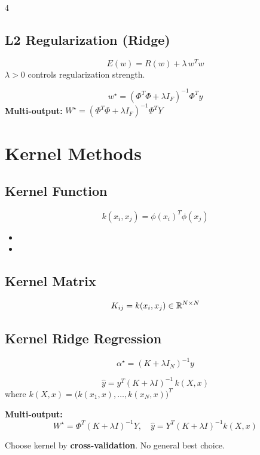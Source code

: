 \documentclass[8pt,a4paper,landscape]{extarticle}
\begin{document}
\begin{multicols*}{4}
\subsection{L2 Regularization (Ridge)}
\begin{defn}[title=Regularized Objective]
\[ E(w) = R(w) + \lambda\,w^T w \]
$\lambda>0$ controls regularization strength.
\end{defn}

\begin{thm}[title=Ridge Regression Solution]
\[ w^\star = (\Phi^T\Phi + \lambda I_F)^{-1}\Phi^T y \]
\textbf{Multi-output:} $W^\star = (\Phi^T\Phi + \lambda I_F)^{-1}\Phi^T Y$
\end{thm}
\section{Kernel Methods}

\subsection{Kernel Function}
\begin{defn}[title=Kernel]
\[ k(x_i, x_j) = \phi(x_i)^T\phi(x_j) \]
\end{defn}

\begin{itemize}
  \item {}
  \item {}
\end{itemize}

\subsection{Kernel Matrix}
\[ K_{ij} = k(x_i, x_j) \in \mathbb{R}^{N\times N} \]

\subsection{Kernel Ridge Regression}
\begin{thm}[title=Kernel Ridge Solution]
\[ \alpha^\star = (K + \lambda I_N)^{-1} y \]
\end{thm}

\begin{thm}[title=Prediction]
\[ \hat{y} = y^T(K+\lambda I)^{-1}\,k(X,x) \]
where $k(X,x) = \bigl(k(x_1,x),\ldots,k(x_N,x)\bigr)^T$
\end{thm}

\textbf{Multi-output:}
\[ W^\star = \Phi^T(K+\lambda I)^{-1}Y, \quad \hat{y} = Y^T(K+\lambda I)^{-1}k(X,x) \]

\begin{warn}[title=Kernel selection]
Choose kernel by \textbf{cross-validation}. No general best choice.
\end{warn}

\end{multicols*}
\end{document}

